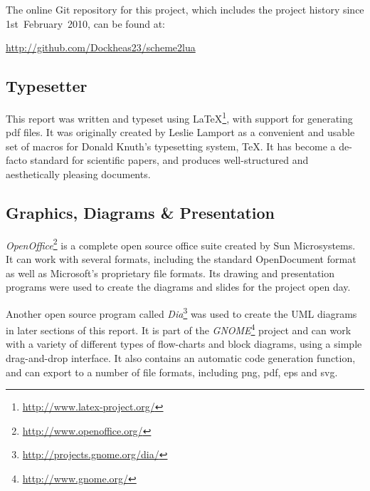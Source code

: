 The online Git repository for this project, which includes the project history
since 1st~February~2010, can be found at:
\begin{framed}
\centering
\url{http://github.com/Dockheas23/scheme2lua}
\end{framed}

\subsection{Typesetter}

This report was written and typeset using
\LaTeX\footnote{\url{http://www.latex-project.org/}}, with support for
generating pdf files. It was originally created by Leslie Lamport as a
convenient and usable set of macros for Donald Knuth's typesetting system, \TeX.
It has become a de-facto standard for scientific papers, and produces
well-structured and aesthetically pleasing documents.

\subsection{Graphics, Diagrams \& Presentation}

\emph{OpenOffice}\footnote{\url{http://www.openoffice.org/}} is a complete open
source office suite created by Sun Microsystems.  It can work with several
formats, including the standard OpenDocument format as well as Microsoft's
proprietary file formats. Its drawing and presentation programs were used to
create the diagrams and slides for the project open day.

Another open source program called
\emph{Dia}\footnote{\url{http://projects.gnome.org/dia/}} was used to create the
UML diagrams in later sections of this report. It is part of the
\emph{GNOME}\footnote{\url{http://www.gnome.org/}} project and can work with a
variety of different types of flow-charts and block diagrams, using a simple
drag-and-drop interface. It also contains an automatic code generation function,
and can export to a number of file formats, including png, pdf, eps and svg.

